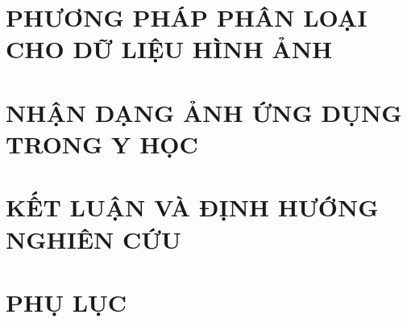 \documentclass[a4paper,oneside]{report}			%
\theoremstyle{plain}
\theoremstyle{plain}
\theoremstyle{nonumberplain}
\begin{document}
\chapter[PHƯƠNG PHÁP PHÂN LOẠI CHO DỮ LIỆU HÌNH ẢNH]{PHƯƠNG PHÁP PHÂN LOẠI \\CHO DỮ LIỆU HÌNH ẢNH}
	

\chapter{NHẬN DẠNG ẢNH ỨNG DỤNG TRONG Y HỌC}
	

\chapter{KẾT LUẬN VÀ ĐỊNH HƯỚNG NGHIÊN CỨU}
	

\chapter{PHỤ LỤC}\label{phuluc}

\end{document}
